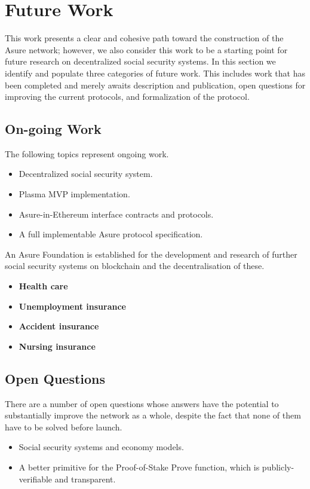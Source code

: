 \section{Future Work}

This work presents a clear and cohesive path toward the construction of the Asure network; however, we also consider this work to be a starting point for future research on decentralized social security systems. In this section we identify and populate three categories of future work. This includes work that has been completed and merely awaits description and publication, open questions for improving the current protocols, and formalization of the protocol.

\subsection{On-going Work}

The following topics represent ongoing work.

\begin{itemize}
\item Decentralized social security system.
\item Plasma MVP implementation.
\item Asure-in-Ethereum interface contracts and protocols.
\item A full implementable Asure protocol specification.
\end{itemize}

An Asure Foundation is established for the development and research of further social security systems on blockchain and the decentralisation of these.

\begin{itemize}
\item \textbf{Health care}
\item \textbf{Unemployment insurance}
\item \textbf{Accident insurance}
\item \textbf{Nursing insurance}
\end{itemize}

\subsection{Open Questions}

There are a number of open questions whose answers have the potential to substantially improve the network as a whole, despite the fact that none of them have to be solved before launch.

\begin{itemize}
\item Social security systems and economy models.
\item A better primitive for the Proof-of-Stake Prove function, which is publicly-verifiable and transparent.
\end{itemize}